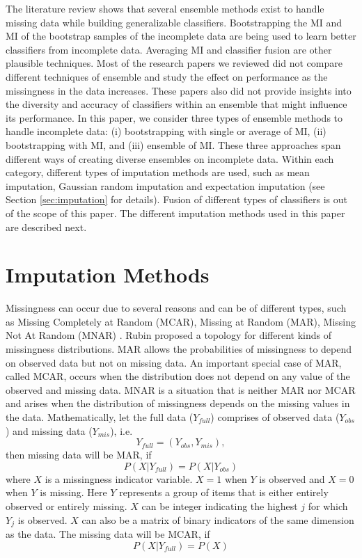 \documentclass{iosart2c}
\begin{document}
The literature review shows that several ensemble methods exist to handle missing data while building generalizable classifiers. Bootstrapping the MI and MI of the bootstrap samples of the incomplete data are being used to learn better classifiers from incomplete data. Averaging MI and classifier fusion are other plausible techniques. Most of the research papers we reviewed did not compare different techniques of ensemble and study the effect on performance as the missingness in the data increases. These papers also did not provide insights into the diversity and accuracy of classifiers within an ensemble that might influence its performance.
In this paper, we consider three types of ensemble methods to handle incomplete data: (i) bootstrapping with single or average of MI, (ii) bootstrapping with MI, and (iii) ensemble of MI. These three approaches span different ways of creating diverse ensembles on incomplete data. Within each category, different types of imputation methods are used, such as mean imputation, Gaussian random imputation and expectation imputation (see Section \ref{sec:imputation} for details). 
Fusion of different types of classifiers is out of the scope of this paper. The different imputation methods used in this paper are described next.

\section{Imputation Methods}
\label{sec:methods}
Missingness can occur due to several reasons and can be of different types, such as Missing Completely at Random (MCAR), Missing at Random (MAR), Missing Not At Random (MNAR) \cite{Rubin1976}. 
 Rubin \cite{Rubin1976} proposed a topology for different kinds of missingness distributions. 
MAR allows the probabilities of missingness to depend on observed data but not on missing data. 
An important special case of MAR, called MCAR, occurs when the distribution does not depend on any value of the observed and missing data. 
MNAR is a situation that is neither MAR nor MCAR and arises when the distribution of missingness depends on the missing values in the data.
Mathematically, let the full data ($Y_{full}$) comprises of observed data ($Y_{obs}$) and missing data ($Y_{mis}$), i.e. 
\[Y_{full} = (Y_{obs}, Y_{mis}),\]
then missing data will be MAR, if
\begin{equation}
 P(X|Y_{full})=P(X|Y_{obs})
\end{equation}
where $X$ is a missingness indicator variable. $X=1$ when $Y$ is observed and $X=0$ when $Y$ is missing. Here $Y$ represents a group of items that is either entirely observed or entirely  missing. $X$ can be integer indicating the highest $j$ for which $Y_j$ is observed. $X$ can also be a matrix of binary indicators of the same dimension as the data. The missing data will be MCAR, if
\begin{equation}
 P(X|Y_{full})=P(X)
\end{equation}
\end{document}
